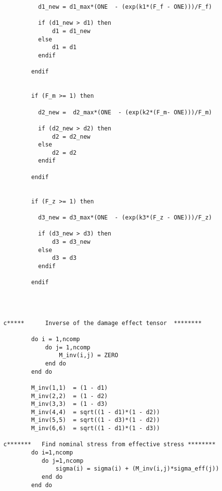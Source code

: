 \begin{lstlisting}
          d1_new = d1_max*(ONE  - (exp(k1*(F_f - ONE)))/F_f)
          
          if (d1_new > d1) then
              d1 = d1_new
          else
              d1 = d1
          endif          
     
        endif        

      
        if (F_m >= 1) then
      
          d2_new =  d2_max*(ONE  - (exp(k2*(F_m- ONE)))/F_m)
          
          if (d2_new > d2) then
              d2 = d2_new
          else
              d2 = d2
          endif      
      
        endif
      
      
        if (F_z >= 1) then
      
          d3_new = d3_max*(ONE  - (exp(k3*(F_z - ONE)))/F_z)
          
          if (d3_new > d3) then
              d3 = d3_new
          else
              d3 = d3
          endif      
          
        endif 
        

        
        
c*****      Inverse of the damage effect tensor  ********
        
        do i = 1,ncomp
            do j= 1,ncomp
                M_inv(i,j) = ZERO
            end do
        end do
        
        M_inv(1,1)  = (1 - d1)
        M_inv(2,2)  = (1 - d2)
        M_inv(3,3)  = (1 - d3)
        M_inv(4,4)  = sqrt((1 - d1)*(1 - d2))
        M_inv(5,5)  = sqrt((1 - d3)*(1 - d2))
        M_inv(6,6)  = sqrt((1 - d1)*(1 - d3))
        
c*******   Find nominal stress from effective stress ********
        do i=1,ncomp
           do j=1,ncomp
               sigma(i) = sigma(i) + (M_inv(i,j)*sigma_eff(j))        
           end do
        end do        



\end{lstlisting}
